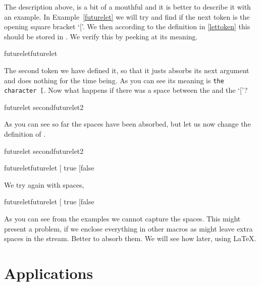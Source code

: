 The description above, is a bit of a mouthful and it is better to describe it with an example. In Example~\ref{futurelet} we will try and find if the next token is the opening square bracket `['. We then according to the definition in \ref{lettoken} this should be stored in . We verify this by peeking at its meaning.

\begin{texexample}{futurelet}{futurelet}
\def\tokentwo#1{}
\futurelet\tokenone\tokentwo[
\meaning\tokenone
\end{texexample}

The second token  we have defined it, so that it justs absorbs its next argument and does nothing for the time being. As you can see its meaning is \texttt{the character [}. Now what happens if there was a space between the  and the `['?

\begin{texexample}{futurelet second}{futurelet2}
\def\tokentwo#1{}
\futurelet\tokenone\tokentwo     [
\meaning\tokenone
\end{texexample}

As you can see so far the spaces have been absorbed, but let us now change the definition of .

\begin{texexample}{futurelet second}{futurelet2}
\def\tokentwo#1{}
\futurelet\tokenone\tokentwo     
\meaning\tokenone
\end{texexample}



\begin{texexample}{futurelet}{futurelet}
\def\tokentwo#1{%
   \ifx\tokenone[ true [\else false\fi
}
\futurelet\tokenone\tokentwo[
\meaning\tokenone
\end{texexample}

We try again with spaces,

\emphasis{tokentwo,[}
\begin{texexample}{futurelet}{futurelet}
\def\tokentwo#1{%
   \ifx\tokenone[ true [\else false\fi
}
\futurelet\tokenone\tokentwo     [
\meaning\tokenone
\end{texexample}

As you can see from the examples we cannot capture the spaces. This might present a problem, if we enclose everything in other macros as \tex might leave extra spaces in the stream. Better to absorb them. We will see how later, using LaTeX. 


\section{Applications}

